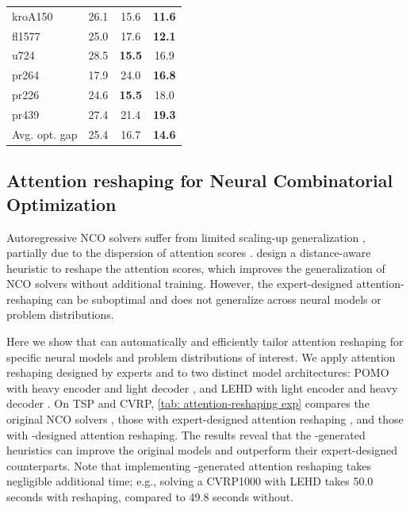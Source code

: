 \begin{table}[!h]
{\begin{tabular}{l|ccc}
    kroA150                       & 26.1  & 15.6 & \textbf{11.6}  \\
    fl1577                        & 25.0  & 17.6 & \textbf{12.1}  \\
    u724                          & 28.5  & \textbf{15.5} & 16.9  \\
    pr264                         & 17.9  & 24.0 & \textbf{16.8}  \\
    pr226                         & 24.6  & \textbf{15.5} & 18.0  \\
    pr439                         & 27.4  & 21.4 & \textbf{19.3}  \\ \midrule
    Avg. opt. gap                 & 25.4  & 16.7 & \textbf{14.6}  \\ \bottomrule
    \end{tabular}}
\end{table}



\subsection{Attention reshaping for Neural Combinatorial Optimization}\label{sec: attention reshaping for nco}
Autoregressive NCO solvers suffer from limited scaling-up generalization \cite{joshi2020_learning_tsp_requires_rethinking_generalization}, partially due to the dispersion of attention scores \cite{wang2024distance_aware_attention_reshaping}. \citet{wang2024distance_aware_attention_reshaping} design a distance-aware heuristic to reshape the attention scores, which improves the generalization of NCO solvers without additional training. However, the expert-designed attention-reshaping can be suboptimal and does not generalize across neural models or problem distributions.


Here we show that \our{} can automatically and efficiently tailor attention reshaping for specific neural models and problem distributions of interest.
We apply attention reshaping designed by experts \cite{wang2024distance_aware_attention_reshaping} and \our{} to two distinct model architectures: POMO with heavy encoder and light decoder \cite{kwon2020pomo}, and LEHD with light encoder and heavy decoder \cite{luo2023nco_heavy_decoder}. On TSP and CVRP, \cref{tab: attention-reshaping exp} compares the original NCO solvers \cite{kwon2020pomo,luo2023nco_heavy_decoder}, those with expert-designed attention reshaping \cite{wang2024distance_aware_attention_reshaping}, and those with \our{}-designed attention reshaping. The results reveal that the \our{}-generated heuristics can improve the original models and outperform their expert-designed counterparts. Note that implementing \our{}-generated attention reshaping takes negligible additional time; e.g., solving a CVRP1000 with LEHD takes 50.0 seconds with reshaping, compared to 49.8 seconds without.

